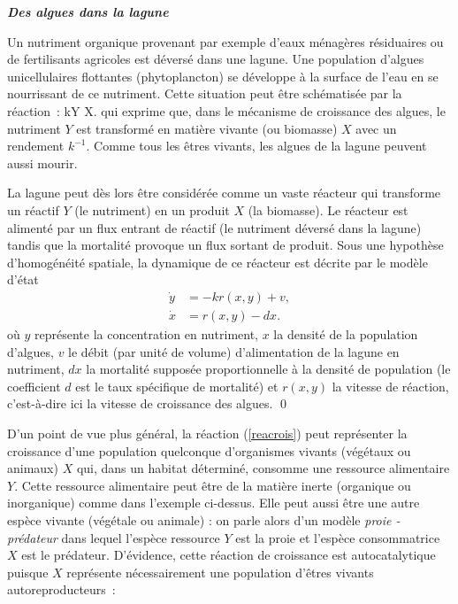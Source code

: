 \begin{exemple}{\bf \em Des algues dans la lagune}

Un nutriment organique provenant par exemple d'eaux ménagères
résiduaires ou de fertilisants agricoles est déversé dans une lagune. Une
population d'algues unicellulaires flottantes (phytoplancton) se développe
à la surface de l'eau en se nourrissant de ce nutriment. Cette situation peut
être schématisée par la réaction~:
\eqn
kY \longrightarrow X. \label{reacrois}
\eeqn
qui exprime que, dans le mécanisme de croissance des algues, le nutriment
$Y$ est transformé en matière vivante (ou biomasse) $X$ avec un
rendement $k^{-1}$. Comme tous les êtres vivants, les algues de la lagune
peuvent aussi mourir.

La lagune peut dès lors être considérée comme un vaste réacteur qui
transforme un réactif $Y$ (le nutriment) en un produit $X$ (la
biomasse). Le réacteur est alimenté par un flux entrant de réactif (le
nutriment déversé dans la lagune) tandis que la mortalité provoque un flux
sortant de produit. Sous une hypothèse
d'homogénéité spatiale, la dynamique de ce réacteur est décrite par
le modèle d'état
\begin{equation} \begin{split} \label{lagune}
\dot y &= -kr(x,y) + v, \\
\dot x &= r(x,y) - dx.
\end{split} \end{equation}
où $y$ représente la concentration en nutriment, $x$ la densité de la
population d'algues, $v$ le débit (par unité de volume) d'alimentation de la
lagune en nutriment, $dx$ la mortalité supposée proportionnelle à la
densité de population (le coefficient $d$ est le taux spécifique de
mortalité) et $r(x,y)$ la vitesse de réaction, c'est-à-dire ici la vitesse
de croissance des algues. \qed
\end{exemple}
D'un point de vue plus général, la réaction (\ref{reacrois}) peut
représenter la croissance d'une population quelconque d'organismes vivants
(végétaux ou animaux) $X$ qui, dans un habitat déterminé, consomme
une ressource alimentaire $Y$. Cette ressource alimentaire peut être de
la matière inerte (organique ou inorganique) comme dans l'exemple
ci-dessus. Elle peut aussi être une autre espèce vivante (végétale ou animale) : on parle
alors d'un modèle {\em proie - prédateur} dans lequel l'espèce ressource
$Y$ est la proie et l'espèce consommatrice $X$ est le prédateur.
D'évidence, cette réaction de croissance est autocatalytique puisque $X$
représente nécessairement une population d'êtres vivants autoreproducteurs~: 
